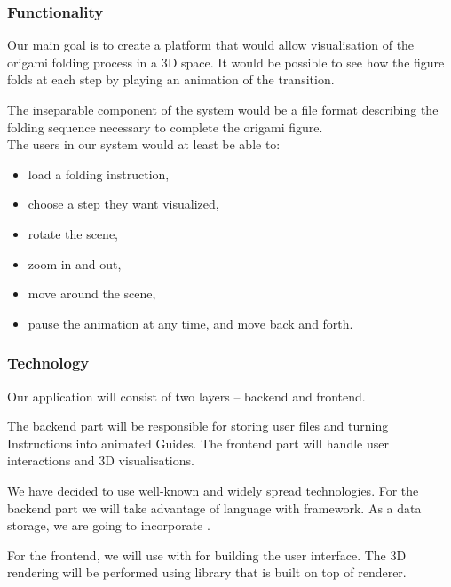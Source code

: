 \subsubsection{Functionality}

Our main goal is to create a platform that would allow visualisation of the origami folding process in a 3D space.
It would be possible to see how the figure folds at each step by playing an animation of the transition.

The inseparable component of the system would be a file format describing the folding sequence necessary to complete the origami figure.\\

The users in our system would at least be able to:
\begin{itemize}
	\item load a folding instruction,
	\item choose a step they want visualized,
	\item rotate the scene,
    \item zoom in and out,
	\item move around the scene,
	\item pause the animation at any time, and move back and forth.
\end{itemize}

\subsubsection{Technology}

Our application will consist of two layers -- backend and frontend.

The backend part will be responsible for storing user files and turning Instructions into animated Guides.
The frontend part will handle user interactions and 3D visualisations.

We have decided to use well-known and widely spread technologies.
For the backend part we will take advantage of  language with  framework.
As a data storage, we are going to incorporate .

For the frontend, we will use  with  for building the user interface.
The 3D rendering will be performed using  library that is built on top of  renderer.

